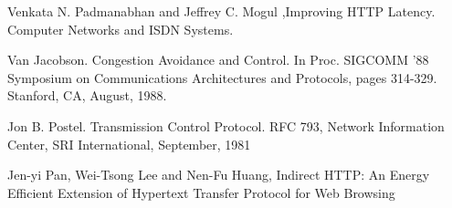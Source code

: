 \documentclass{sigplanconf}
\begin{document}
\begin{thebibliography}{}
\softraggedright

 Venkata N. Padmanabhan and Jeffrey C. Mogul ,Improving HTTP Latency. Computer Networks and ISDN Systems.

Van Jacobson. Congestion Avoidance and Control. In Proc. SIGCOMM ’88 Symposium on Communications Architectures and Protocols, pages 314-329. Stanford, CA, August, 1988.

Jon B. Postel. Transmission Control Protocol. RFC 793, Network Information Center, SRI International, September, 1981

Jen-yi Pan, Wei-Tsong Lee and Nen-Fu Huang, Indirect HTTP: An Energy Efficient Extension of Hypertext Transfer Protocol for Web Browsing

\end{thebibliography}
\end{document}
